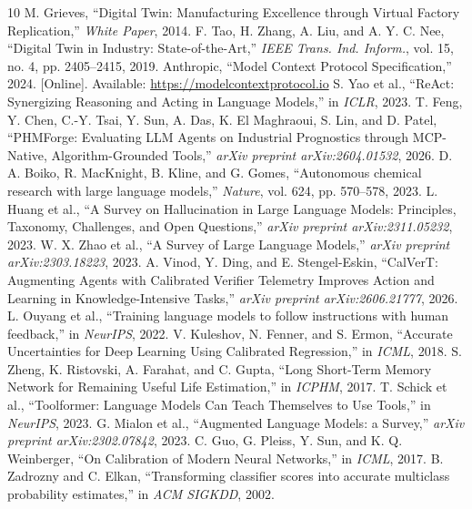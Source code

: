 \documentclass[10pt,twocolumn,a4paper]{article}
\begin{document}
\begin{thebibliography}{10}
 M. Grieves, ``Digital Twin: Manufacturing Excellence through Virtual Factory Replication,'' \textit{White Paper}, 2014.
 F. Tao, H. Zhang, A. Liu, and A. Y. C. Nee, ``Digital Twin in Industry: State-of-the-Art,'' \textit{IEEE Trans. Ind. Inform.}, vol. 15, no. 4, pp. 2405--2415, 2019.
 Anthropic, ``Model Context Protocol Specification,'' 2024. [Online]. Available: \url{https://modelcontextprotocol.io}
 S. Yao et al., ``ReAct: Synergizing Reasoning and Acting in Language Models,'' in \textit{ICLR}, 2023.
 T. Feng, Y. Chen, C.-Y. Tsai, Y. Sun, A. Das, K. El Maghraoui, S. Lin, and D. Patel, ``PHMForge: Evaluating LLM Agents on Industrial Prognostics through MCP-Native, Algorithm-Grounded Tools,'' \textit{arXiv preprint arXiv:2604.01532}, 2026.
 D. A. Boiko, R. MacKnight, B. Kline, and G. Gomes, ``Autonomous chemical research with large language models,'' \textit{Nature}, vol. 624, pp. 570--578, 2023.
 L. Huang et al., ``A Survey on Hallucination in Large Language Models: Principles, Taxonomy, Challenges, and Open Questions,'' \textit{arXiv preprint arXiv:2311.05232}, 2023.
 W. X. Zhao et al., ``A Survey of Large Language Models,'' \textit{arXiv preprint arXiv:2303.18223}, 2023.
 A. Vinod, Y. Ding, and E. Stengel-Eskin, ``CalVerT: Augmenting Agents with Calibrated Verifier Telemetry Improves Action and Learning in Knowledge-Intensive Tasks,'' \textit{arXiv preprint arXiv:2606.21777}, 2026.
 L. Ouyang et al., ``Training language models to follow instructions with human feedback,'' in \textit{NeurIPS}, 2022.
 V. Kuleshov, N. Fenner, and S. Ermon, ``Accurate Uncertainties for Deep Learning Using Calibrated Regression,'' in \textit{ICML}, 2018.
 S. Zheng, K. Ristovski, A. Farahat, and C. Gupta, ``Long Short-Term Memory Network for Remaining Useful Life Estimation,'' in \textit{ICPHM}, 2017.
 T. Schick et al., ``Toolformer: Language Models Can Teach Themselves to Use Tools,'' in \textit{NeurIPS}, 2023.
 G. Mialon et al., ``Augmented Language Models: a Survey,'' \textit{arXiv preprint arXiv:2302.07842}, 2023.
 C. Guo, G. Pleiss, Y. Sun, and K. Q. Weinberger, ``On Calibration of Modern Neural Networks,'' in \textit{ICML}, 2017.
 B. Zadrozny and C. Elkan, ``Transforming classifier scores into accurate multiclass probability estimates,'' in \textit{ACM SIGKDD}, 2002.
\end{thebibliography}
\end{document}
